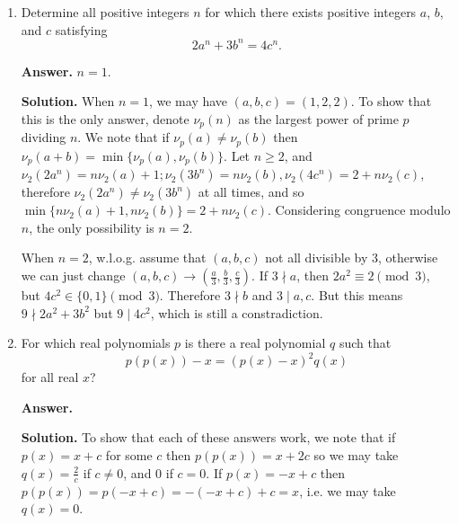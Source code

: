 \documentclass[11pt,a4paper]{article}
\begin{document}
	\begin{enumerate}
		\item [A1.] 
		Determine all positive integers $n$ for which there exists positive integers $a$, $b$, and $c$ satisfying
		\[
		2a^n+3b^n=4c^n.
		\]
		
		\textbf{Answer.} $n = 1$. 
		
		\textbf{Solution.} When $n = 1$, we may have $(a, b, c)=(1, 2, 2)$. 
		To show that this is the only answer, denote $\nu_p(n)$ as the largest power of prime $p$ dividing $n$. 
		We note that if $\nu_p(a)\neq \nu_p(b)$ then $\nu_p(a + b) = \min\{\nu_p(a), \nu_p(b)\}$. 
		Let $n\ge 2$, 
		and $\nu_2(2a^n) = n\nu_2(a)+1; \nu_2(3b^n)=n\nu_2(b), \nu_2(4c^n)=2+n\nu_2(c)$, 
		therefore $\nu_2(2a^n)\neq \nu_2(3b^n)$ at all times, 
		and so $\min\{n\nu_2(a)+1, n\nu_2(b)\}=2+n\nu_2(c)$. 
		Considering congruence modulo $n$, the only possibility is $n = 2$. 
		
		When $n = 2$, w.l.o.g. assume that $(a, b, c)$ not all divisible by 3, 
		otherwise we can just change $(a, b, c)\to (\frac{a}{3}, \frac{b}{3}, \frac{c}{3})$. 
		If $3\nmid a$, then $2a^2\equiv 2\pmod{3}$, 
		but $4c^2\in \{0, 1\}\pmod{3}$. 
		Therefore $3\nmid b$ and $3\mid a, c$. 
		But this means $9\nmid 2a^2+3b^2$ but $9\mid 4c^2$, 
		which is still a constradiction. 
		
		\item [A2.] For which real polynomials $p$ is there a real polynomial $q$ such that
		\[
		p(p(x))-x=(p(x)-x)^2q(x)
		\]for all real $x$?
		
		\textbf{Answer.} 
		
		\textbf{Solution.} 
		To show that each of these answers work, we note that 
		if $p(x)=x+c$ for some $c$ then 
		$p(p(x)) = x+2c$ so we may take $q(x) = \frac{2}{c}$ if $c\neq 0$, 
		and 0 if $c = 0$. 
		If $p(x)=-x+c$ then $p(p(x)) = p(-x+c) = -(-x+c)+c = x$, 
		i.e. we may take $q(x)=0$. 
		

\end{enumerate}
\end{document}
